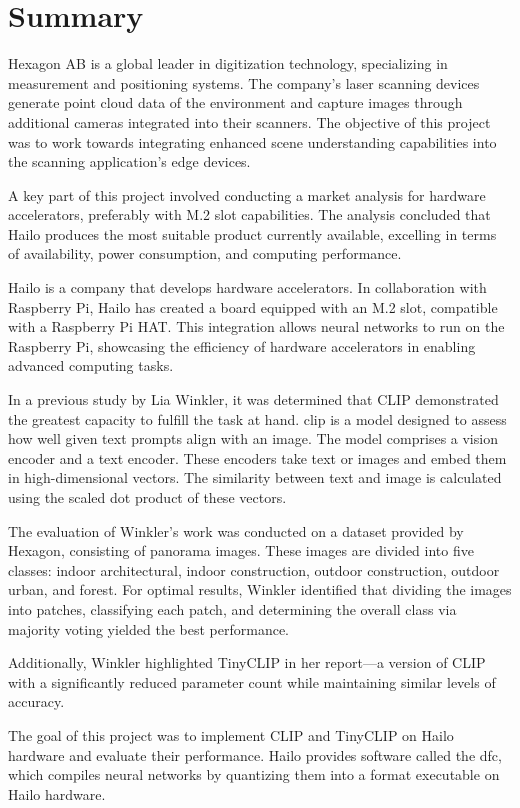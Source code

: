 \chapter*{Summary}  
Hexagon AB is a global leader in digitization technology, specializing in measurement and positioning systems.  
The company's laser scanning devices generate point cloud data of the environment and capture images through additional cameras integrated into their scanners.  
The objective of this project was to work towards integrating enhanced scene understanding capabilities into the scanning application's edge devices.  

A key part of this project involved conducting a market analysis for hardware accelerators, preferably with M.2 slot capabilities.  
The analysis concluded that Hailo produces the most suitable product currently available, excelling in terms of availability, power consumption, and computing performance.  

Hailo is a company that develops hardware accelerators.  
In collaboration with Raspberry Pi, Hailo has created a board equipped with an M.2 slot, compatible with a Raspberry Pi HAT.  
This integration allows neural networks to run on the Raspberry Pi, showcasing the efficiency of hardware accelerators in enabling advanced computing tasks.  

In a previous study by Lia Winkler, it was determined that CLIP demonstrated the greatest capacity to fulfill the task at hand.  
\acrfull{clip} is a model designed to assess how well given text prompts align with an image.  
The model comprises a vision encoder and a text encoder.
These encoders take text or images and embed them in high-dimensional vectors. 
The similarity between text and image is calculated using the scaled dot product of these vectors.  

The evaluation of Winkler's work was conducted on a dataset provided by Hexagon, consisting of panorama images.  
These images are divided into five classes: indoor architectural, indoor construction, outdoor construction, outdoor urban, and forest.  
For optimal results, Winkler identified that dividing the images into patches, classifying each patch, and determining the overall class via majority voting yielded the best performance.  

Additionally, Winkler highlighted TinyCLIP in her report—a version of CLIP with a significantly reduced parameter count while maintaining similar levels of accuracy.  

The goal of this project was to implement CLIP and TinyCLIP on Hailo hardware and evaluate their performance.  
Hailo provides software called the \acrfull{dfc}, which compiles neural networks by quantizing them into a format executable on Hailo hardware.  

